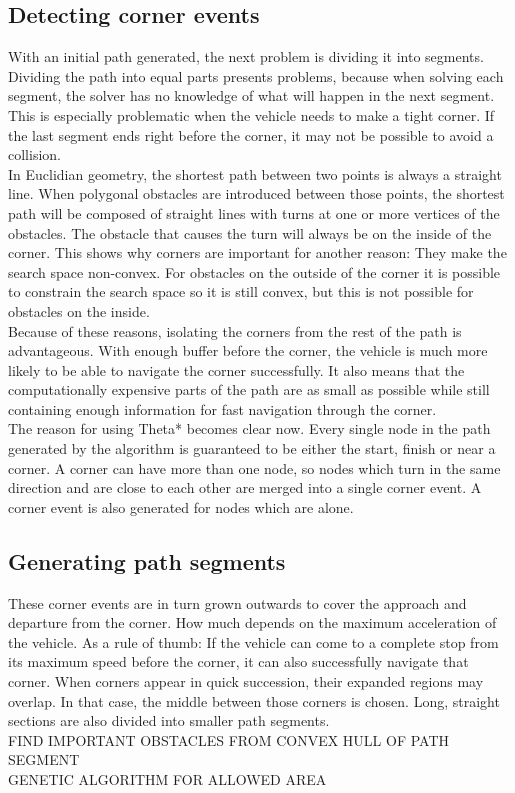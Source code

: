 \documentclass[12pt]{article}
\begin{document}
\subsection{Detecting corner events}
With an initial path generated, the next problem is dividing it into segments. Dividing the path into equal parts presents problems, because when solving each segment, the solver has no knowledge of what will happen in the next segment. This is especially problematic when the vehicle needs to make a tight corner. If the last segment ends right before the corner, it may not be possible to avoid a collision.\\
In Euclidian geometry, the shortest path between two points is always a straight line. When polygonal obstacles are introduced between those points, the shortest path will be composed of straight lines with turns at one or more vertices of the obstacles. The obstacle that causes the turn will always be on the inside of the corner. This shows why corners are important for another reason: They make the search space non-convex. For obstacles on the outside of the corner it is possible to constrain the search space so it is still convex, but this is not possible for obstacles on the inside.\\
Because of these reasons, isolating the corners from the rest of the path is advantageous. With enough buffer before the corner, the vehicle is much more likely to be able to navigate the corner successfully. It also means that the computationally expensive parts of the path are as small as possible while still containing enough information for fast navigation through the corner.
\\
The reason for using Theta* becomes clear now. Every single node in the path generated by the algorithm is guaranteed to be either the start, finish or near a corner. A corner can have more than one node, so nodes which turn in the same direction and are close to each other are merged into a single corner event. A corner event is also generated for nodes which are alone.
\subsection{Generating path segments}
These corner events are in turn grown outwards to cover the approach and departure from the corner. How much depends on the maximum acceleration of the vehicle. As a rule of thumb: If the vehicle can come to a complete stop from its maximum speed before the corner, it can also successfully navigate that corner. When corners appear in quick succession, their expanded regions may overlap. In that case, the middle between those corners is chosen. Long, straight sections are also divided into smaller path segments.\\

FIND IMPORTANT OBSTACLES FROM CONVEX HULL OF PATH SEGMENT\\
GENETIC ALGORITHM FOR ALLOWED AREA\\



\end{document}
